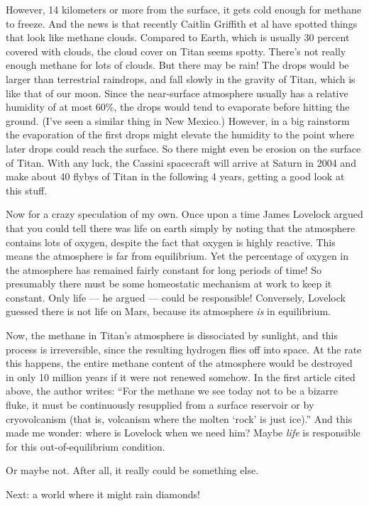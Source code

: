 \documentclass{article}
\begin{document}
However, 14 kilometers or more from the surface, it gets cold enough for
methane to freeze. And the news is that recently Caitlin Griffith et al
have spotted things that look like methane clouds. Compared to Earth,
which is usually 30 percent covered with clouds, the cloud cover on
Titan seems spotty. There's not really enough methane for lots of
clouds. But there may be rain! The drops would be larger than
terrestrial raindrops, and fall slowly in the gravity of Titan, which is
like that of our moon. Since the near-surface atmosphere usually has a
relative humidity of at most 60\%, the drops would tend to evaporate
before hitting the ground. (I've seen a similar thing in New Mexico.)
However, in a big rainstorm the evaporation of the first drops might
elevate the humidity to the point where later drops could reach the
surface. So there might even be erosion on the surface of Titan. With
any luck, the Cassini spacecraft will arrive at Saturn in 2004 and make
about 40 flybys of Titan in the following 4 years, getting a good look
at this stuff.

Now for a crazy speculation of my own. Once upon a time James Lovelock
argued that you could tell there was life on earth simply by noting that
the atmosphere contains lots of oxygen, despite the fact that oxygen is
highly reactive. This means the atmosphere is far from equilibrium. Yet
the percentage of oxygen in the atmosphere has remained fairly constant
for long periods of time! So presumably there must be some homeostatic
mechanism at work to keep it constant. Only life --- he argued --- could
be responsible! Conversely, Lovelock guessed there is not life on Mars,
because its atmosphere \emph{is} in equilibrium.

Now, the methane in Titan's atmosphere is dissociated by sunlight, and
this process is irreversible, since the resulting hydrogen flies off
into space. At the rate this happens, the entire methane content of the
atmosphere would be destroyed in only 10 million years if it were not
renewed somehow. In the first article cited above, the author writes:
``For the methane we see today not to be a bizarre fluke, it must be
continuously resupplied from a surface reservoir or by cryovolcanism
(that is, volcanism where the molten `rock' is just ice).'' And this
made me wonder: where is Lovelock when we need him? Maybe \emph{life} is
responsible for this out-of-equilibrium condition.

Or maybe not. After all, it really could be something else.

Next: a world where it might rain diamonds!
\end{document}
